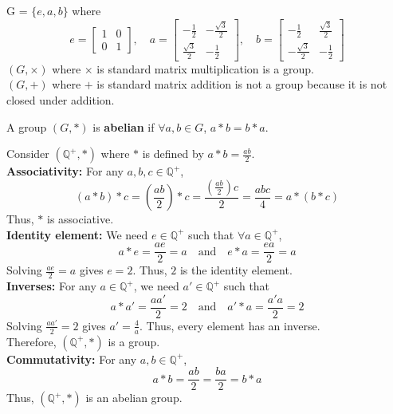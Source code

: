 \begin{eg}
        G = $\{e, a, b\}$
        where 
        \[ e = \begin{bmatrix}
        1 & 0 \\
        0 & 1
        \end{bmatrix}, \quad 
        a = \begin{bmatrix}
        -\frac{1}{2} & -\frac{\sqrt{3}}{2} \\
        \frac{\sqrt{3}}{2} & -\frac{1}{2}
        \end{bmatrix}, \quad 
        b = \begin{bmatrix}
        -\frac{1}{2} & \frac{\sqrt{3}}{2} \\
        -\frac{\sqrt{3}}{2} & -\frac{1}{2}
        \end{bmatrix} \]
    $(G, \times)$ where $\times$ is standard matrix multiplication is a group.\\
    $(G, +)$ where $+$ is standard matrix addition is not a group because it is not closed under addition.
\end{eg}

\begin{definition}
    A group $(G, *)$ is \textbf{abelian} if $\forall a, b \in G$, $a * b = b * a$.
\end{definition}
\begin{eg}
    Consider $(\mathbb{Q}^+, *)$ where $*$ is defined by $a * b = \frac{ab}{2}$.\\
    \indent \textbf{Associativity:} For any $a, b, c \in \mathbb{Q}^+$,
    \[
    (a * b) * c = \left(\frac{ab}{2}\right) * c = \frac{\left(\frac{ab}{2}\right)c}{2} = \frac{abc}{4} = a * (b * c)
    \]
    Thus, $*$ is associative.\\
    \indent \textbf{Identity element:} We need $e \in \mathbb{Q}^+$ such that $\forall a \in \mathbb{Q}^+$,
    \[
    a * e = \frac{ae}{2} = a \quad \text{and} \quad e * a = \frac{ea}{2} = a
    \]
    Solving $\frac{ae}{2} = a$ gives $e = 2$. Thus, $2$ is the identity element.\\
    \indent \textbf{Inverses:} For any $a \in \mathbb{Q}^+$, we need $a' \in \mathbb{Q}^+$ such that
    \[
    a * a' = \frac{aa'}{2} = 2 \quad \text{and} \quad a' * a = \frac{a'a}{2} = 2
    \]
    Solving $\frac{aa'}{2} = 2$ gives $a' = \frac{4}{a}$. Thus, every element has an inverse.\\
    Therefore, $(\mathbb{Q}^+, *)$ is a group.\\
    \indent \textbf{Commutativity:} For any $a, b \in \mathbb{Q}^+$,
    \[
    a * b = \frac{ab}{2} = \frac{ba}{2} = b * a
    \]
    Thus, $(\mathbb{Q}^+, *)$ is an abelian group.
\end{eg}

